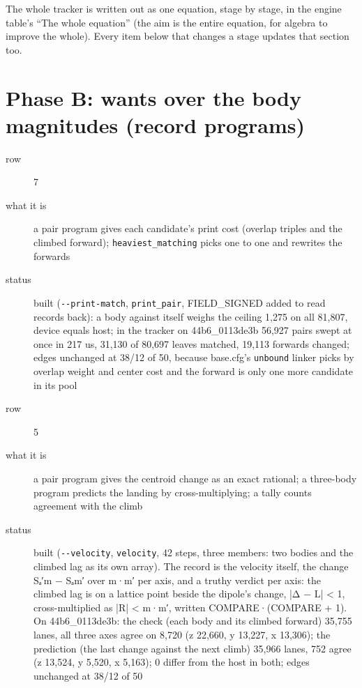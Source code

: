 The whole tracker is written out as one equation, stage by stage, in the engine table's “The whole equation” (the aim is the entire equation, for algebra to improve the whole). Every item below that changes a stage updates that section too.

\section{\texorpdfstring{Phase B: wants over the body magnitudes (record programs)}{Phase B: wants over the body magnitudes (record programs)}}

\begin{description}
\item[{row}] 7
\item[{what it is}] a pair program gives each candidate's print cost (overlap triples and the climbed forward); \texttt{heaviest\_\allowbreak{}matching} picks one to one and rewrites the forwards
\item[{status}] built (\texttt{-\allowbreak{}-\allowbreak{}print-\allowbreak{}match}, \texttt{print\_\allowbreak{}pair}, FIELD\_\allowbreak{}SIGNED added to read records back): a body against itself weighs the ceiling 1,275 on all 81,807, device equals host; in the tracker on 44b6\_\allowbreak{}0113de3b 56,927 pairs swept at once in 217 us, 31,130 of 80,697 leaves matched, 19,113 forwards changed; edges unchanged at 38/12 of 50, because base.cfg's \texttt{unbound} linker picks by overlap weight and center cost and the forward is only one more candidate in its pool
\end{description}

\begin{description}
\item[{row}] 5
\item[{what it is}] a pair program gives the centroid change as an exact rational; a three-body program predicts the landing by cross-multiplying; a tally counts agreement with the climb
\item[{status}] built (\texttt{-\allowbreak{}-\allowbreak{}velocity}, \texttt{velocity}, 42 steps, three members: two bodies and the climbed lag as its own array). The record is the velocity itself, the change Sₐ′m − Sₐm′ over m·m′ per axis, and a truthy verdict per axis: the climbed lag is on a lattice point beside the dipole's change, |Δ − L| < 1, cross-multiplied as |R| < m·m′, written COMPARE·(COMPARE + 1). On 44b6\_\allowbreak{}0113de3b: the check (each body and its climbed forward) 35,755 lanes, all three axes agree on 8,720 (z 22,660, y 13,227, x 13,306); the prediction (the last change against the next climb) 35,966 lanes, 752 agree (z 13,524, y 5,520, x 5,163); 0 differ from the host in both; edges unchanged at 38/12 of 50
\end{description}

